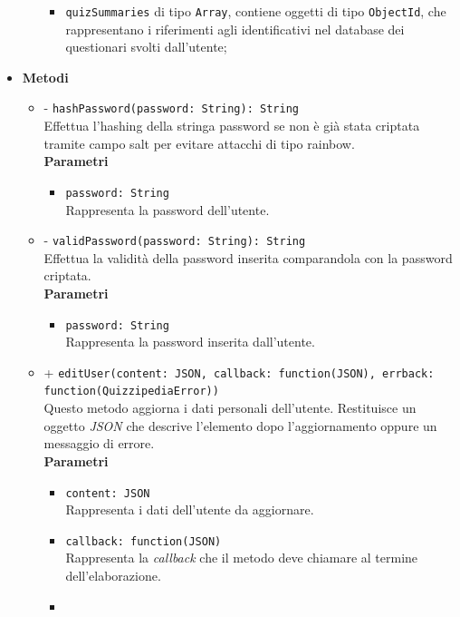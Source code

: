 \begin{itemize}
\begin{itemize}
\begin{itemize}
				\item
					\texttt{quizSummaries} di tipo \texttt{Array}, contiene oggetti di tipo \texttt{ObjectId}, che rappresentano i riferimenti agli identificativi nel database dei questionari svolti dall'utente;		
			\end{itemize}	
		\end{itemize}	
	\item \textbf{Metodi}
		\begin{itemize}
		\item
		- \texttt{hashPassword(password: String): String} \\
		Effettua l'hashing della stringa password se non è già stata criptata tramite campo salt per evitare attacchi di tipo rainbow. \\
		\textbf{Parametri} 
			\begin{itemize}
			\item
				 \texttt{password: String} \\
				Rappresenta la password dell'utente.
			\end{itemize}
		\item
		- \texttt{validPassword(password: String): String} \\
		Effettua la validità della password inserita comparandola con la password criptata.	\\
		\textbf{Parametri} 
			\begin{itemize}
			\item
				\texttt{password: String} \\
				Rappresenta la password inserita dall'utente.
			\end{itemize}
		\item
		+ \texttt{editUser(content: JSON, callback: function(JSON), errback: function(QuizzipediaError))} \\
		Questo metodo aggiorna i dati personali dell'utente. Restituisce un oggetto \textit{JSON} che descrive l’elemento dopo l’aggiornamento oppure un messaggio di errore.	\\
		\textbf{Parametri} 
			\begin{itemize}
			\item
				\texttt{content: JSON} \\
				Rappresenta i dati dell'utente da aggiornare.
			\item	
				\texttt{callback: function(JSON)} \\
				Rappresenta la \textit{callback} che il metodo deve chiamare al termine dell'elaborazione.
			\item	

\end{itemize}
\end{itemize}
\end{itemize}
